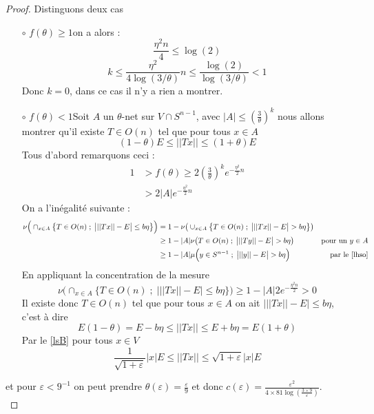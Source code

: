 \documentclass[12pt]{article}
\begin{document}
\begin{proof}
	Distinguons deux cas 
	\begin{enumerate}[leftmargin=\labelsep]
		\item[$\circ$] {$f(\theta)\geq1$}\newline on a alors :
		\begin{equation*}
		\frac{\eta^2n}{4}\leq \log(2)
		\end{equation*}
		\begin{equation*}
		k\leq \frac{\eta^2}{4\log(3/\theta)}n\leq \frac{\log(2)}{\log(3/\theta)}<1
		\end{equation*}
		Donc $k=0$, dans ce cas il n'y a rien a montrer.
		\item[$\circ$] $f(\theta)<1$\newline Soit $A$ un $\theta$-net sur $V\cap S^{n-1}$, avec $|A|\leq(\frac{3}{\theta})^k$ nous allons montrer qu'il existe $T\in O(n)$ tel que pour tous $x\in A$ 
		\begin{equation*}
		(1-\theta) E \leq ||Tx|| \leq (1+ \theta)E
		\end{equation*}
		Tous d'abord remarquons ceci :
		\begin{align*}
		1&>f(\theta)\geq 2(\frac{3}{\theta})^ke^{-\frac{\eta^2}{2}n} \\
		&> 2|A|e^{-\frac{\eta^2}{2}n}
		\end{align*}
		On a l'inégalité suivante : 
		\begin{align*}
		\nu\Big(\cap_{x\in A}\big\{T\in O(n)\; ; \;  \big| ||Tx||-E \big|\leq b\eta\big\}\Big)& = 1-\nu\big(\cup_{x\in A}\big\{T\in O(n)\; ; \; \big| ||Tx||-E \big|>b\eta\big\}\big)& \\
		& \geq 1-|A|\nu\big(T\in O(n)\; ; \; \big| ||Ty||-E \big|>b\eta\big)& \text{pour un $y\in A$}\\
		& \geq 1 - |A|\mu\Big(y\in S^{n-1}\; ;\; \big| ||y||-E \big|>b\eta\Big) & \text{par le \ref{lhso}}
		\end{align*} 
		En appliquant la concentration de la mesure
		\begin{equation*}
		\nu\Big(\cap_{x\in A}\big\{T\in O(n)\; ; \;  \big| ||Tx||-E \big|\leq b\eta\big\}\Big)\geq 1 - |A|2e^{-\frac{\eta^2n}{2}} >0
		\end{equation*}	
		Il existe donc $T\in O(n)$ tel que pour tous $x\in A$ on ait $\big|||Tx||-E \big|\leq b \eta$, c'est à dire 
		\begin{equation*}
		E(1-\theta)=E-b\eta\leq ||Tx||\leq E+b\eta=E(1+\theta)
		\end{equation*}
		Par le \ref{lsB} pour tous $x\in V$
		\begin{equation*}
		\frac{1}{\sqrt{1+\varepsilon}}|x| E\leq ||Tx||\leq \sqrt{1+\varepsilon}|x| E
		\end{equation*}
	\end{enumerate}
	et pour $\varepsilon<9^{-1}$ on peut prendre $\theta(\varepsilon)=\frac{\varepsilon}{9}$ et donc $c(\varepsilon)=\frac{\varepsilon^2}{4\times 81\log(\frac{3\times9}{\varepsilon})} $.\\ 
\end{proof}
\end{document}
